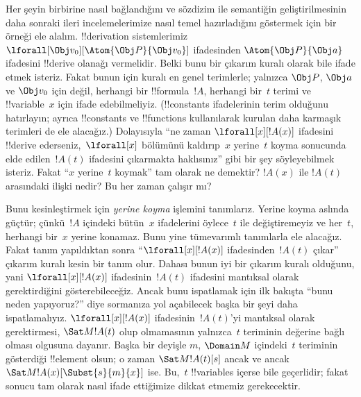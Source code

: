 \documentclass[../../../include/open-logic-section]{subfiles}
\begin{document}


Her şeyin birbirine nasıl bağlandığını ve sözdizim ile semantiğin
geliştirilmesinin daha sonraki ileri incelemelerimize nasıl temel
hazırladığını göstermek için bir örneği ele alalım. !!{derivation}
sistemlerimiz $\lforall[\Obj v_0][\Atom{\Obj P}{\Obj v_0}]$
ifadesinden $\Atom{\Obj P}{\Obj a}$ ifadesini !!{derive} olanağı
vermelidir. Belki bunu bir çıkarım kuralı olarak bile ifade etmek
isteriz. Fakat bunun için kuralı en genel terimlerle; yalnızca
$\Obj P$, $\Obj a$ ve $\Obj v_0$ için değil, herhangi bir
!!{formula}~$!A$, herhangi bir~$t$ terimi ve !!{variable}~$x$ için
ifade edebilmeliyiz. (!!{constant}s ifadelerinin terim olduğunu
hatırlayın; ayrıca !!{constant}s ve !!{function}s kullanılarak kurulan
daha karmaşık terimleri de ele alacağız.) Dolayısıyla ``ne zaman
$\lforall[x][!A(x)]$ ifadesini !!{derive} ederseniz,~$\lforall[x]$
bölümünü kaldırıp~$x$ yerine~$t$ koyma sonucunda elde edilen~$!A(t)$
ifadesini çıkarmakta haklısınız'' gibi bir şey söyleyebilmek isteriz.
Fakat ``$x$ yerine~$t$ koymak'' tam olarak ne demektir? $!A(x)$ ile
$!A(t)$ arasındaki ilişki nedir? Bu her zaman çalışır mı?

Bunu kesinleştirmek için \emph{yerine koyma} işlemini tanımlarız.
Yerine koyma aslında güçtür; çünkü~$!A$ içindeki bütün~$x$ ifadelerini
öylece~$t$ ile değiştiremeyiz ve her~$t$, herhangi bir~$x$ yerine
konamaz. Bunu yine tümevarımlı tanımlarla ele alacağız. Fakat tanım
yapıldıktan sonra ``$\lforall[x][!A(x)]$ ifadesinden~$!A(t)$ çıkar''
çıkarım kuralı kesin bir tanım olur. Dahası bunun iyi bir çıkarım
kuralı olduğunu, yani $\lforall[x][!A(x)]$ ifadesinin~$!A(t)$
ifadesini mantıksal olarak gerektirdiğini gösterebileceğiz. Ancak bunu
ispatlamak için ilk bakışta ``bunu neden yapıyoruz?'' diye sormanıza
yol açabilecek başka bir şeyi daha ispatlamalıyız.
$\lforall[x][!A(x)]$ ifadesinin~$!A(t)$'yi mantıksal olarak
gerektirmesi, $\Sat M{!A(t)}$ olup olmamasının yalnızca~$t$ teriminin
değerine bağlı olması olgusuna dayanır. Başka bir deyişle $m$,
$\Domain M$ içindeki~$t$ teriminin gösterdiği !!{element} olsun; o
zaman $\Sat M{!A(t)}[s]$ ancak ve ancak
$\Sat M{!A(x)}[\Subst{s}{m}{x}]$ ise. Bu,~$t$ !!{variable}s içerse
bile geçerlidir; fakat sonucu tam olarak nasıl ifade ettiğimize dikkat
etmemiz gerekecektir.
\end{document}
